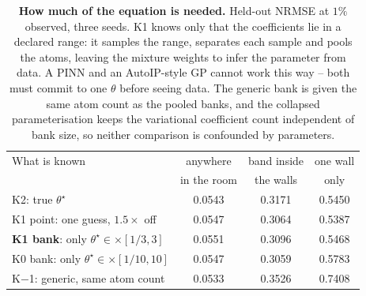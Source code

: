 \begin{table}[t]
  \centering
  \caption{\textbf{How much of the equation is needed.}  Held-out NRMSE at $1\%$ observed, three seeds.  K1 knows only that the coefficients lie in a declared range: it samples the range, separates each sample and pools the atoms, leaving the mixture weights to infer the parameter from data.  A PINN and an AutoIP-style GP cannot work this way -- both must commit to one $\theta$ before seeing data.  The generic bank is given the same atom count as the pooled banks, and the collapsed parameterisation keeps the variational coefficient count independent of bank size, so neither comparison is confounded by parameters.}
  \label{tab:ladder}
  \small
  \begin{tabular}{lccc}
    \toprule
    What is known & anywhere & band inside & one wall \\
    & in the room & the walls & only \\
    \midrule
    K2: true $\theta^\star$ & 0.0543 & 0.3171 & 0.5450 \\
    K1 point: one guess, $1.5\times$ off & 0.0547 & 0.3064 & 0.5387 \\
    \textbf{K1 bank}: only $\theta^\star \in \times[1/3,3]$ & 0.0551 & 0.3096 & 0.5468 \\
    K0 bank: only $\theta^\star \in \times[1/10,10]$ & 0.0547 & 0.3059 & 0.5783 \\
    K$-$1: generic, same atom count & 0.0533 & 0.3526 & 0.7408 \\
    \bottomrule
  \end{tabular}
\end{table}
